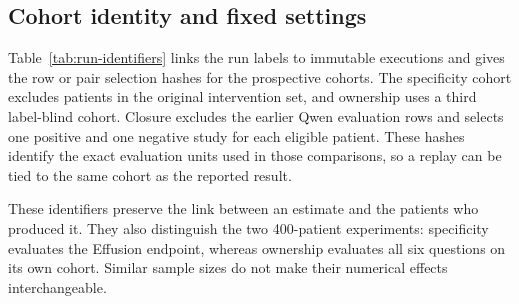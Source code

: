 \subsection{Cohort identity and fixed settings}

Table~\ref{tab:run-identifiers} links the run labels to immutable executions
and gives the row or pair selection hashes for the prospective cohorts.
The specificity cohort excludes patients in the original intervention set,
and ownership uses a third label-blind cohort. Closure excludes the earlier
Qwen evaluation rows and selects one positive and one negative study for
each eligible patient. These hashes identify the exact evaluation units
used in those comparisons, so a replay can be tied to the same cohort as the
reported result.

\begin{table}[H]
\centering
\caption{Immutable run identifiers and evaluation-cohort selection hashes.}
\label{tab:run-identifiers}
\end{table}

These identifiers preserve the link between an estimate and the patients
who produced it. They also distinguish the two 400-patient experiments:
specificity evaluates the Effusion endpoint, whereas ownership evaluates
all six questions on its own cohort. Similar sample sizes do not make
their numerical effects interchangeable.

